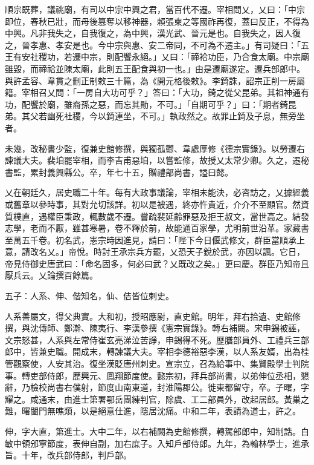 \begin{pinyinscope}
 順宗既葬，議祧廟，有司以中宗中興之君，當百代不遷。宰相問乂，乂曰：「中宗即位，春秋已壯，而母後篡奪以移神器，賴張柬之等國祚再復，蓋曰反正，不得為中興。凡非我失之，自我復之，為中興，漢光武、晉元是也。自我失之，因人復之，晉孝惠、孝安是也。今中宗與惠、安二帝同，不可為不遷主。」有司疑曰：「五王有安社稷功，若遷中宗，則配饗永絕。」乂曰：「禘袷功臣，乃合食太廟。中宗廟雖毀，而禘祫並陳太廟，此則五王配食與初一也。」由是遷廟遂定。遷兵部郎中。與許孟容、韋貫之刪正制敕三十篇，為《開元格後敕》。李錡誅，詔宗正削一房屬籍。宰相召乂問：「一房自大功可乎？」答曰：「大功，錡之從父昆弟。其祖神通有功，配饗於廟，雖裔孫之惡，而忘其勛，不可。」「自期可乎？」曰：「期者錡昆弟。其父若幽死社稷，今以錡連坐，不可。」執政然之。故罪止錡及子息，無旁坐者。



 未幾，改秘書少監，復兼史館修撰，與獨孤鬱、韋處厚修《德宗實錄》。以勞遷右諫議大夫。裴垍罷宰相，而李吉甫惡垍，以嘗監修，故授乂太常少卿。久之，遷秘書監，累封義興縣公。卒，年七十五，贈禮部尚書，謚曰懿。



 乂在朝廷久，居史職二十年。每有大政事議論，宰相未能決，必咨訪之，乂據經義或舊章以參時事，其對允切該詳。初以是被遇，終亦忤貴近，介介不至顯官。然資質樸直，遇權臣秉政，輒數歲不遷。嘗疏裴延齡罪惡及拒王叔文，當世高之。結發志學，老而不厭，雖甚寒暑，卷不釋於前，故能通百家學，尤明前世沿革。家藏書至萬五千卷。初名武，憲宗時因進見，請曰：「陛下今日偃武修文，群臣當順承上意，請改名乂。」帝悅。時討王承宗兵方罷，乂恐天子銳於武，亦因以諷。它日，帝見侍御史唐武曰：「命名固多，何必曰武？乂既改之矣。」更曰慶。群臣乃知帝且厭兵云。乂論撰百餘篇。



 五子：人系、伸、偕知名，仙、佶皆位刺史。



 人系善屬文，得父典實。大和初，授昭應尉，直史館。明年，拜右拾遺、史館修撰，與沈傳師、鄭澣、陳夷行、李漢參撰《憲宗實錄》。轉右補闕。宋申錫被誣，文宗怒甚，人系與左常侍崔玄亮涕泣苦諍，申錫得不死。歷膳部員外、工禮兵三部郎中，皆兼史職。開成末，轉諫議大夫。宰相李德裕惡李漢，以人系友婿，出為桂管觀察使，人安其治。復坐漢貶唐州刺史。宣宗立，召為給事中、集賢殿學士判院事。轉吏部侍郎，歷興元、鳳翔節度使。懿宗初，拜兵部尚書，以弟伸位丞相，懇辭，乃檢校尚書右僕射，節度山南東道，封淮陽郡公。徙東都留守，卒。子曙，字耀之。咸通末，由進士第署鄂岳團練判官，除虞、工二部員外，改起居郎。黃巢之難，曙闔門無噍類，以是絕意仕進，隱居沈痛。中和二年，表請為道士，許之。



 伸，字大直，第進士。大中二年，以右補闕為史館修撰，轉駕部郎中，知制誥。白敏中領邠寧節度，表伸自副，加右庶子。入知戶部侍郎。九年，為翰林學士，進承旨。十年，改兵部侍郎，判戶部。




\end{pinyinscope}
